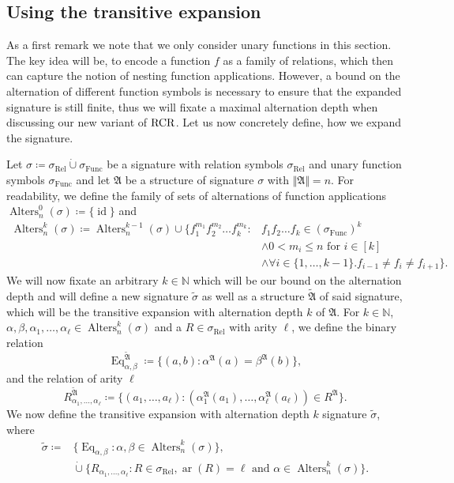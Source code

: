 \subsection{Using the transitive expansion} 
\label{sec:TransitiveExpansion}

As a first remark we note that we only consider unary functions in this section.
The key idea will be, to encode a function $f$ as a family of relations, which then can capture the notion of nesting function applications.
However, a bound on the alternation of different function symbols is necessary to ensure that the expanded signature is still finite, thus we will fixate a maximal alternation depth when discussing our new variant of $\operatorname{RCR}$.
Let us now concretely define, how we expand the signature.

\begin{definition}
	Let $\sigma\coloneqq \sigma_{\operatorname{Rel}} \operatorname{\dot{\cup}} \sigma_{\operatorname{Func}}$ be a signature with relation symbols $\sigma_{\operatorname{Rel}}$ and unary function symbols $\sigma_{\operatorname{Func}}$ and let $\mathfrak A$ be a structure of signature $\sigma$ with $\Vert \mathfrak A \Vert=n$.
	For readability, we define the family of sets of alternations of function applications $\operatorname{Alters}_n^0(\sigma)\coloneqq\{\operatorname{id}\}$ and
	\begin{align*}
		\operatorname{Alters}^k_{n}(\sigma)\coloneqq \operatorname{Alters}^{k-1}_{n}(\sigma)\cup\{f_1^{m_1}f_2^{m_2}\dots f_k^{m_k} : & f_1f_2\dots f_k\in (\sigma_{\operatorname{Func}})^k \\ 
		& \land 0 < m_i \leq n \text{ for } i \in [k] \\ 
		& \land \forall i\in\{1,\dots,k-1\} . f_{i-1}\neq f_i \neq f_{i+1}\}.
	\end{align*}
	We will now fixate an arbitrary $k\in\mathbb N$ which will be our bound on the alternation depth and will define a new signature $\widetilde{\sigma}$ as well as a structure $\widetilde{\mathfrak A}$ of said signature, which will be the transitive expansion with alternation depth $k$ of $\mathfrak{A}$.
	For $k\in\mathbb N$, $\alpha,\beta,\alpha_1,\dots,\alpha_\ell\in \operatorname{Alters}^k_n(\sigma)$ and a $R\in \sigma_{\operatorname{Rel}}$ with arity $\ell$, we define the binary relation
	$$\operatorname{Eq}_{\alpha,\beta}^{\widetilde{\mathfrak A}}\coloneqq \{(a,b) : \alpha^{\mathfrak A}(a)=\beta^{\mathfrak A}(b)\},$$
	and the relation of arity $\ell$
	$$R_{\alpha_1,\dots,\alpha_\ell}^{\widetilde{\mathfrak A}} \coloneqq \{(a_1,\dots,a_\ell) : (\alpha_1^{\mathfrak A}(a_1),\dots,\alpha_\ell^{\mathfrak A}(a_\ell))\in R^{\mathfrak A}\}.$$
	We now define the transitive expansion with alternation depth $k$ signature $\widetilde{\sigma}$, where 
	\begin{align*}
		\widetilde{\sigma}\coloneqq & \{\operatorname{Eq}_{\alpha,\beta}: \alpha,\beta\in\operatorname{Alters}^k_n(\sigma)\}, \\
		& \operatorname{\dot{\cup}} \{R_{\alpha_1,\dots,\alpha_\ell} : R\in \sigma_{\operatorname{Rel}},\operatorname{ar}(R)=\ell \text{ and } \alpha\in \operatorname{Alters}^k_n(\sigma)\}.
	\end{align*}
\end{definition}

